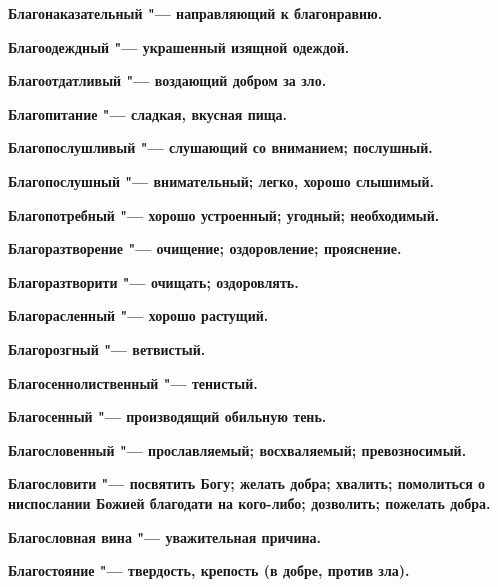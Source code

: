 \begin{mymulticols}{2}
\bfseries Благонаказательный\normalfont{} "--- направляющий к благонравию. 




\bfseries Благоодеждный\normalfont{} "--- украшенный изящной одеждой. 




\bfseries Благоотдатливый\normalfont{} "--- воздающий добром за зло. 




\bfseries Благопитание\normalfont{} "--- сладкая, вкусная пища. 




\bfseries Благопослушливый\normalfont{} "--- слушающий со вниманием; послушный. 




\bfseries Благопослушный\normalfont{} "--- внимательный; легко, хорошо слышимый. 




\bfseries Благопотребный\normalfont{} "--- хорошо устроенный; угодный; необходимый. 




\bfseries Благоразтворение\normalfont{} "--- очищение; оздоровление; прояснение. 




\bfseries Благоразтворити\normalfont{} "--- очищать; оздоровлять. 




\bfseries Благорасленный\normalfont{} "--- хорошо растущий. 




\bfseries Благорозгный\normalfont{} "--- ветвистый. 




\bfseries Благосеннолиственный\normalfont{} "--- тенистый. 




\bfseries Благосенный\normalfont{} "--- производящий обильную тень. 




\bfseries Благословенный\normalfont{} "--- прославляемый; восхваляемый; превозносимый. 




\bfseries Благословити\normalfont{} "--- посвятить Богу; желать добра; хвалить; помолиться о ниспослании Божией благодати на кого-либо; дозволить; пожелать добра. 




\bfseries Благословная вина\normalfont{} "--- уважительная причина. 




\bfseries Благостояние\normalfont{} "--- твердость, крепость (в добре, против зла). 





\end{mymulticols}

